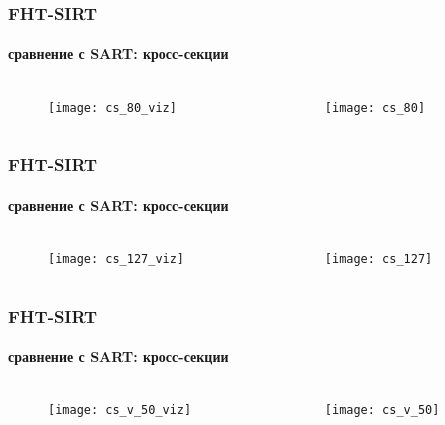 \begin{frame}
\frametitle{FHT-SIRT}
\framesubtitle{сравнение с SART: кросс-секции}
\begin{columns}[T,onlytextwidth]
  \hspace*{-1cm}
  \begin{column}{0.2\textwidth}
    \begin{figure}
      \centering
      \vspace{1.5cm}
      \texttt{[image: cs\_80\_viz]}
    \end{figure}
  \end{column}
  \begin{column}{0.8\textwidth}
    \begin{figure}
      \centering
      \vspace{-1cm}
      \texttt{[image: cs\_80]}
    \end{figure}
  \end{column}
\end{columns}
\end{frame}

\begin{frame}
\frametitle{FHT-SIRT}
\framesubtitle{сравнение с SART: кросс-секции}
\begin{columns}[T,onlytextwidth]
  \hspace*{-1cm}
  \begin{column}{0.2\textwidth}
    \begin{figure}
      \centering
      \vspace{1.5cm}
      \texttt{[image: cs\_127\_viz]}
    \end{figure}
  \end{column}
  \begin{column}{0.8\textwidth}
    \begin{figure}
      \centering
      \vspace{-1cm}
      \texttt{[image: cs\_127]}
    \end{figure}
  \end{column}
\end{columns}
\end{frame}


\begin{frame}
\frametitle{FHT-SIRT}
\framesubtitle{сравнение с SART: кросс-секции}
\begin{columns}[T,onlytextwidth]
  \hspace*{-1cm}
  \begin{column}{0.2\textwidth}
    \begin{figure}
      \centering
      \vspace{1.5cm}
      \texttt{[image: cs\_v\_50\_viz]}
    \end{figure}
  \end{column}
  \begin{column}{0.8\textwidth}
    \begin{figure}
      \centering
      \vspace{-1cm}
      \texttt{[image: cs\_v\_50]}
    \end{figure}
  \end{column}
\end{columns}
\end{frame}